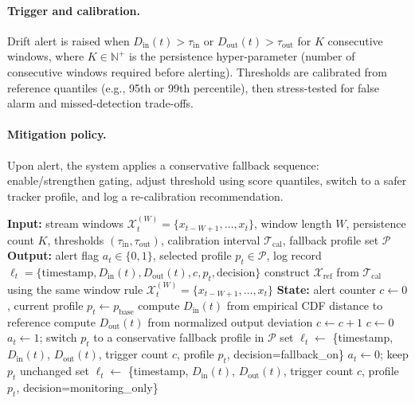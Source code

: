 \documentclass[5p,twocolumn,a4paper]{elsarticle}
\begin{document}
\paragraph{Trigger and calibration.}
Drift alert is raised when $D_{\mathrm{in}}(t)>\tau_{\mathrm{in}}$ or $D_{\mathrm{out}}(t)>\tau_{\mathrm{out}}$ for $K$ consecutive windows, where $K\in\mathbb{N}^{+}$ is the persistence hyper-parameter (number of consecutive windows required before alerting). Thresholds are calibrated from reference quantiles (e.g., 95th or 99th percentile), then stress-tested for false alarm and missed-detection trade-offs.

\paragraph{Mitigation policy.}
Upon alert, the system applies a conservative fallback sequence: enable/strengthen gating, adjust threshold using score quantiles, switch to a safer tracker profile, and log a re-calibration recommendation.

\begin{algorithm}[t]
\caption{Drift-aware closed-loop monitoring and fallback}
\label{alg:drift_loop}
\begin{algorithmic}[1]
\State \textbf{Input:} stream windows $\mathcal{X}_t^{(W)}=\{x_{t-W+1},\ldots,x_t\}$, window length $W$, persistence count $K$, thresholds $(\tau_{\mathrm{in}},\tau_{\mathrm{out}})$, calibration interval $\mathcal{T}_{\mathrm{cal}}$, fallback profile set $\mathcal{P}$
\State \textbf{Output:} alert flag $a_t \in \{0,1\}$, selected profile $p_t \in \mathcal{P}$, log record $\ell_t=\{\text{timestamp},D_{\mathrm{in}}(t),D_{\mathrm{out}}(t),c,p_t,\text{decision}\}$
\State construct $\mathcal{X}_{\mathrm{ref}}$ from $\mathcal{T}_{\mathrm{cal}}$ using the same window rule $\mathcal{X}_t^{(W)}=\{x_{t-W+1},\ldots,x_t\}$
\State \textbf{State:} alert counter $c \gets 0$, current profile $p_t \gets p_{\mathrm{base}}$
  \State compute $D_{\mathrm{in}}(t)$ from empirical \textsc{CDF} distance to reference
  \State compute $D_{\mathrm{out}}(t)$ from normalized output deviation
    \State $c \gets c+1$
  \Else
    \State $c \gets 0$
  \EndIf
    \State $a_t \gets 1$; switch $p_t$ to a conservative fallback profile in $\mathcal{P}$
    \State set $\ell_t \gets$ \{timestamp, $D_{\mathrm{in}}(t)$, $D_{\mathrm{out}}(t)$, trigger count $c$, profile $p_t$, decision=fallback\_on\}
  \Else
    \State $a_t \gets 0$; keep $p_t$ unchanged
    \State set $\ell_t \gets$ \{timestamp, $D_{\mathrm{in}}(t)$, $D_{\mathrm{out}}(t)$, trigger count $c$, profile $p_t$, decision=monitoring\_only\}
  \EndIf
\EndFor
\end{algorithmic}
\end{algorithm}
\end{document}
